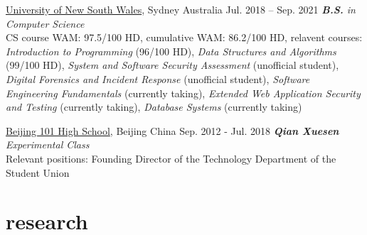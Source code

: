 \documentclass[hidelinks__VERSION__]{adamyi-cv}
\begin{document}
\begin{entrylist}


\entry
{\href{https://unsw.edu.au}{University of New South Wales}, Sydney Australia}
{Jul. 2018 -- Sep. 2021}
{\emph{\textbf{B.S.} in Computer Science}\\
CS course WAM: 97.5/100 HD, cumulative WAM: 86.2/100 HD, relavent courses: \emph{Introduction to Programming} (96/100 HD), \emph{Data Structures and Algorithms} (99/100 HD), \emph{System and Software Security Assessment} (unofficial student), \emph{Digital Forensics and Incident Response} (unofficial student), \emph{Software Engineering Fundamentals} (currently taking), \emph{Extended Web Application Security and Testing} (currently taking), \emph{Database Systems} (currently taking)
}

\entry
{\href{http://beijing101.com}{Beijing 101 High School}, Beijing China}
{Sep. 2012 - Jul. 2018}
{\emph{\textbf{Qian Xuesen} Experimental Class}\\
Relevant positions: Founding Director of the Technology Department of the Student Union
}

\end{entrylist}


\section{research}
\end{document}
